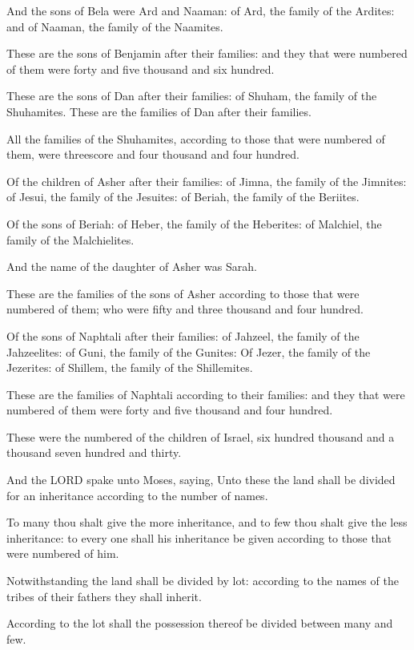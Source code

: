 \Verse And the sons of Bela were Ard and Naaman: of Ard, the family of
the Ardites: and of Naaman, the family of the Naamites.

\Verse These are the sons of Benjamin after their families: and they
that were numbered of them were forty and five thousand and six
hundred.

\Verse These are the sons of Dan after their families: of Shuham, the
family of the Shuhamites. These are the families of Dan after their
families.

\Verse All the families of the Shuhamites, according to those that were
numbered of them, were threescore and four thousand and four hundred.

\Verse Of the children of Asher after their families: of Jimna, the
family of the Jimnites: of Jesui, the family of the Jesuites: of
Beriah, the family of the Beriites.

\Verse Of the sons of Beriah: of Heber, the family of the Heberites: of
Malchiel, the family of the Malchielites.

\Verse And the name of the daughter of Asher was Sarah.

\Verse These are the families of the sons of Asher according to those
that were numbered of them; who were fifty and three thousand and four
hundred.

\Verse Of the sons of Naphtali after their families: of Jahzeel, the
family of the Jahzeelites: of Guni, the family of the Gunites: \Verse
Of Jezer, the family of the Jezerites: of Shillem, the family of the
Shillemites.

\Verse These are the families of Naphtali according to their families:
and they that were numbered of them were forty and five thousand and
four hundred.

\Verse These were the numbered of the children of Israel, six hundred
thousand and a thousand seven hundred and thirty.

\Verse And the LORD spake unto Moses, saying, \Verse Unto these the land
shall be divided for an inheritance according to the number of names.

\Verse To many thou shalt give the more inheritance, and to few thou
shalt give the less inheritance: to every one shall his inheritance be
given according to those that were numbered of him.

\Verse Notwithstanding the land shall be divided by lot: according to
the names of the tribes of their fathers they shall inherit.

\Verse According to the lot shall the possession thereof be divided
between many and few.

